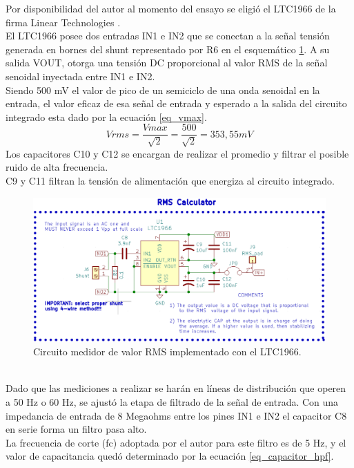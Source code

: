 Por disponibilidad del autor al momento del ensayo se eligió el LTC1966 de la firma Linear Technologies \citep{ad636}.\\
El LTC1966 posee dos entradas IN1 e IN2 que se conectan a la señal tensión generada en bornes del shunt representado por R6 en el esquemático \ref{fig:ctomedidorrms}. A su salida VOUT, otorga una tensión DC proporcional al valor RMS de la señal senoidal inyectada entre IN1 e IN2.\\
Siendo 500 mV el valor de pico de un semiciclo de una onda senoidal en la entrada, el valor eficaz de esa señal de entrada y esperado a la salida del circuito integrado esta dado por la ecuación \ref{eq_vmax}.
\begin{equation}
	\label{eq_vmax}
	Vrms=\frac{Vmax}{\sqrt{2}}=\frac{500}{\sqrt{2}}= 353,55 mV
\end{equation}
Los capacitores C10 y C12 se encargan de realizar el promedio y filtrar el posible ruido de alta frecuencia.\\
C9 y C11 filtran la tensión de alimentación que energiza al circuito integrado.\\
\begin{figure}[h!]
	\centering
	\includegraphics[width=1.0\linewidth]{Figures/cto_medidor_rms}
	\caption{Circuito medidor de valor RMS implementado con el LTC1966.}
	\label{fig:ctomedidorrms}
\end{figure}\\
Dado que las mediciones a realizar se harán en líneas de distribución que operen a 50 Hz o 60 Hz, se ajustó la etapa de filtrado de la señal de entrada. Con una impedancia de entrada de 8 Megaohms entre los pines IN1 e IN2 el capacitor C8 en serie forma un filtro pasa alto.\\
La frecuencia de corte (fc) adoptada por el autor para este filtro es de 5 Hz, y el valor de capacitancia quedó determinado por la ecuación \ref{eq_capacitor_hpf}.
